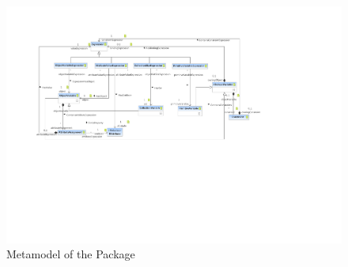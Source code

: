 %
%

\begin{figure}[htbp]
  \centering
  \includegraphics[width=\textheight,angle=90]{figures/A_technical-reference/packages/storydiagrams_patterns_expressions/storydiagrams-patterns-expressions}
  \caption{Metamodel of the  Package}
  \label{fig:MM:patterns:expressions}
\end{figure}